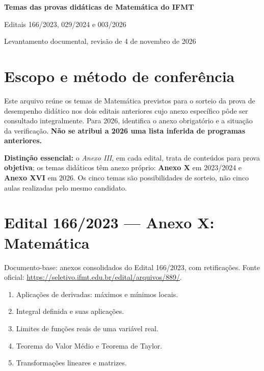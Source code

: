 \documentclass[11pt,a4paper]{article}
\begin{document}
\begin{center}
{\LARGE\bfseries Temas das provas didáticas de Matemática do IFMT\par}
\vspace{4pt}
{\large Editais 166/2023, 029/2024 e 003/2026\par}
\vspace{6pt}
{\small Levantamento documental, revisão de 4 de novembro de 2026\par}
\end{center}
\tableofcontents
\newpage

\section{Escopo e método de conferência}
Este arquivo reúne os temas de Matemática previstos para o sorteio da prova de desempenho didático nos dois editais anteriores cujo anexo específico pôde ser consultado integralmente. Para 2026, identifica o anexo obrigatório e a situação da verificação. \textbf{Não se atribui a 2026 uma lista inferida de programas anteriores.}

\textbf{Distinção essencial:} o \emph{Anexo III}, em cada edital, trata de conteúdos para prova \textbf{objetiva}; os temas didáticos têm anexo próprio: \textbf{Anexo X} em 2023/2024 e \textbf{Anexo XVI} em 2026. Os cinco temas são possibilidades de sorteio, não cinco aulas realizadas pelo mesmo candidato.

\section{Edital 166/2023 --- Anexo X: Matemática}
Documento-base: anexos consolidados do Edital 166/2023, com retificações. Fonte oficial:
\url{https://seletivo.ifmt.edu.br/edital/arquivos/889/}.

\begin{enumerate}
\item Aplicações de derivadas: máximos e mínimos locais.
\item Integral definida e suas aplicações.
\item Limites de funções reais de uma variável real.
\item Teorema do Valor Médio e Teorema de Taylor.
\item Transformações lineares e matrizes.
\end{enumerate}
\end{document}
